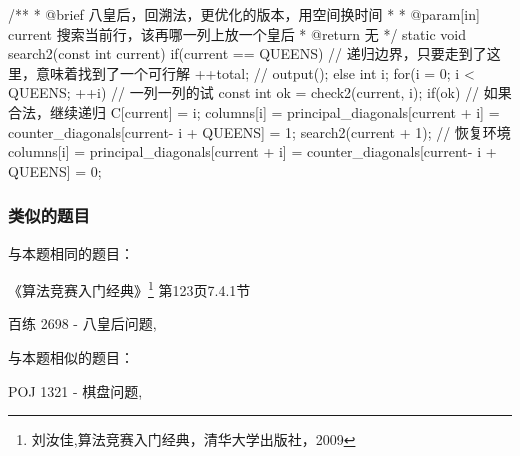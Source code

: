 \begin{Codex}[label=eight_queen.c]
/** 
 * @brief 八皇后，回溯法，更优化的版本，用空间换时间
 *
 * @param[in] current 搜索当前行，该再哪一列上放一个皇后
 * @return 无
 */
static void search2(const int current) {
    if(current == QUEENS) {  // 递归边界，只要走到了这里，意味着找到了一个可行解
        ++total;
        // output();
    } else {
        int i;
        for(i = 0; i < QUEENS; ++i) {  // 一列一列的试
            const int ok = check2(current, i);
            if(ok) {  // 如果合法，继续递归
                C[current] = i;
                columns[i] = principal_diagonals[current + i] = 
                    counter_diagonals[current- i + QUEENS] = 1;
                search2(current + 1);
                // 恢复环境
                columns[i] = principal_diagonals[current + i] = 
                    counter_diagonals[current- i + QUEENS] = 0;
            }
        }
    }
}
\end{Codex}

\subsubsection{类似的题目}
与本题相同的题目：
\begindot
\item 《算法竞赛入门经典》\footnote{刘汝佳,算法竞赛入门经典，清华大学出版社，2009} 第123页7.4.1节
\item  百练 2698 - 八皇后问题, 
\myenddot

与本题相似的题目：
\begindot
\item POJ 1321 - 棋盘问题, 
\myenddot
